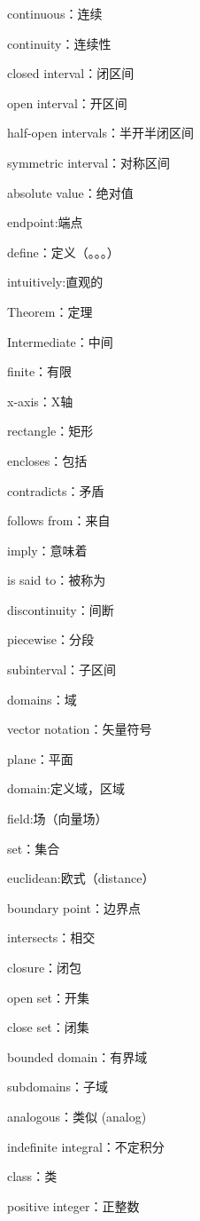 \documentclass[hazy,blue,11pt]{elegantnote}
\begin{document}
    continuous：连续

    continuity：连续性
    
    closed interval：闭区间

    open interval：开区间

    half-open intervals：半开半闭区间

    symmetric interval：对称区间

    absolute value：绝对值

    endpoint:端点

    define：定义（。。。）

    intuitively:直观的

    Theorem：定理

    Intermediate：中间

    finite：有限

    x-axis：X轴

    rectangle：矩形

    encloses：包括

    contradicts：矛盾

    follows from：来自

    imply：意味着

    is said to：被称为

    discontinuity：间断

    piecewise：分段
    
    subinterval：子区间

    domains：域

    vector notation：矢量符号

    plane：平面

    domain:定义域，区域

    field:场（向量场）

    set：集合

    euclidean:欧式（distance）

    boundary point：边界点

    intersects：相交

    closure：闭包

    open set：开集

    close set：闭集

    bounded domain：有界域

    subdomains：子域

    analogous：类似
    (analog)
    
    indefinite integral：不定积分

    class：类

    positive integer：正整数
\end{document}
